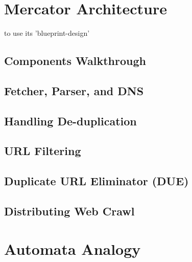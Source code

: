 \section{Mercator Architecture}
to use its 'blueprint-design'

\subsection{Components Walkthrough}
\subsection{Fetcher, Parser, and DNS}
\subsection{Handling De-duplication}
\subsection{URL Filtering}
\subsection{Duplicate URL Eliminator (DUE)}
\subsection{Distributing Web Crawl}

\pagebreak
\section{Automata Analogy}